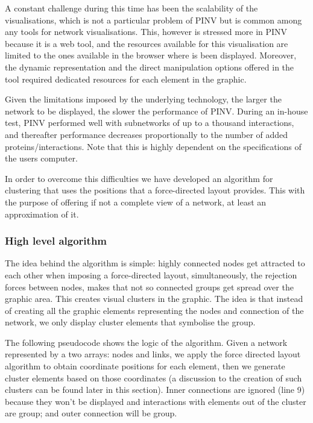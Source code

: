 A constant challenge during this time has been the scalability of the visualisations, which is not a particular problem of PINV but is common among any tools for network visualisations. This, however is stressed more in PINV because it is a web tool, and the resources available for this visualisation are limited to the ones available in the browser where is been displayed. Moreover, the dynamic representation and the direct manipulation options offered in the tool required dedicated resources for each element in the graphic.

Given the limitations imposed by the underlying technology, the larger the network to be displayed, the slower the performance of PINV. During an in-house test, PINV performed well with subnetworks of up to a thousand interactions, and thereafter performance decreases proportionally to the number of added proteins/interactions. Note that this is highly dependent on the specifications of the users computer. 

In order to overcome this difficulties we have developed an algorithm for clustering that uses the positions that a force-directed layout provides. This with the purpose of offering if not a complete view of a network, at least an approximation of it.

\subsubsection{High level algorithm}
The idea behind the algorithm is simple: highly connected nodes get attracted to each other when imposing a force-directed layout, simultaneously, the rejection forces between nodes, makes that not so connected groups get spread over the graphic area. This creates visual clusters in the graphic. The idea is that instead of creating all the graphic elements representing the nodes and connection of the network, we only display cluster elements that symbolise the group.

The following pseudocode shows the logic of the algorithm. Given a network represented by a two arrays: nodes and links, we apply the force directed layout algorithm to obtain coordinate positions for each element, then we generate cluster elements based on those coordinates (a discussion to the creation of such clusters can be found later in this section). Inner connections are ignored (line 9) because they won't be displayed and interactions with elements out of the cluster are group;  and outer connection will be group.

